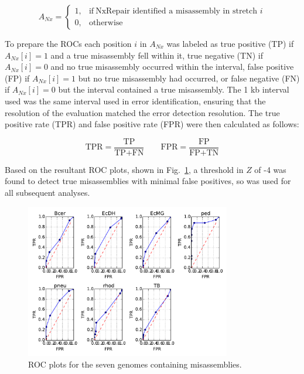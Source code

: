 \documentclass[fleqn,10pt]{wlpeerj}
\begin{document}
\begin{equation}
    A_{Nx}=
    \begin{cases}
      1, & \text{if}\ \text{NxRepair identified a misassembly in stretch $i$} \\
      0, & \text{otherwise}
    \end{cases}
  \label{eq:found}
\end{equation}

To prepare the ROCs each position $i$ in $A_{Nx}$ was labeled as true positive (TP) if $A_{Nx}[i] = 1$ and a true misassembly fell within it, true negative (TN) if $A_{Nx}[i] = 0$ and no true misassembly occurred within the interval, false positive (FP) if $A_{Nx}[i] = 1$ but no true misassembly had occurred, or false negative (FN) if $A_{Nx}[i] = 0$ but the interval contained a true misassembly. The 1 kb interval used was the same interval used in error identification, ensuring that the resolution of the evaluation matched the error detection resolution. The true positive rate (TPR) and false positive rate (FPR) were then calculated as follows:

\begin{equation}
\text{TPR} = \frac{\text{TP}}{\text{TP} + \text{FN}} \qquad \text{FPR} = \frac{\text{FP}}{\text{FP} + \text{TN}}
\label{eq:tpr}
\end{equation}

Based on the resultant ROC plots, shown in Fig.~\ref{fig:ROCs}, a threshold in $Z$ of -4 was found to detect true misassemblies with minimal false positives, so was used for all subsequent analyses. 

\begin{figure}
\centerline{\includegraphics[width=0.8\textwidth]{allROC.pdf}}
\caption{ROC plots for the seven genomes containing misassemblies.\label{fig:ROCs}}
\end{figure}
\end{document}
